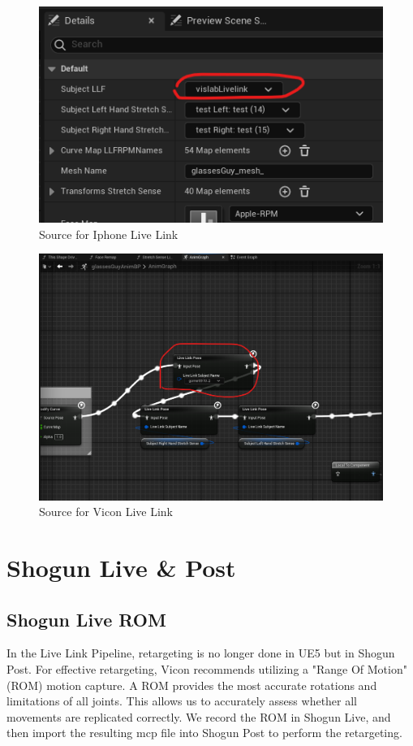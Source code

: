 \documentclass{uva-inf-article}
\begin{document}
\begin{figure}
    \centering
    \includegraphics[height=0.4\textwidth]{imgs/iphonesource.png}
    \caption{Source for Iphone Live Link}
    \label{fig:iphonesource}
\end{figure}
\begin{figure}
    \centering
    \includegraphics[height=0.6\textwidth]{imgs/viconsource.png}
    \caption{Source for Vicon Live Link}
    \label{fig:viconsource}
\end{figure}


\section{Shogun Live \& Post}
\subsection{Shogun Live ROM}
In the Live Link Pipeline, retargeting is no longer done in UE5 but in Shogun Post. For effective retargeting, Vicon recommends utilizing a "Range Of Motion" (ROM) motion capture. A ROM provides the most accurate rotations and limitations of all joints. This allows us to accurately assess whether all movements are replicated correctly. We record the ROM in Shogun Live, and then import the resulting mcp file into Shogun Post to perform the retargeting.
\end{document}
